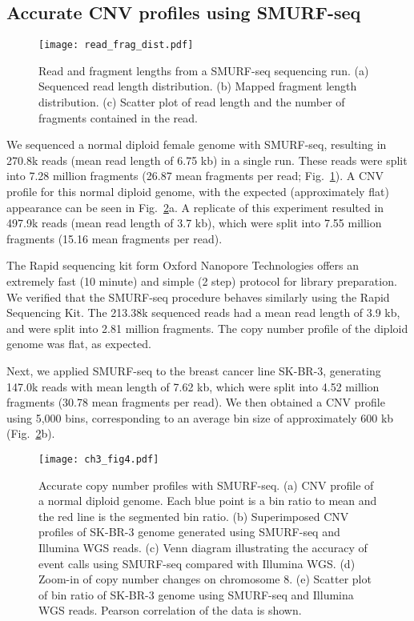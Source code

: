 \subsection{Accurate CNV profiles using SMURF-seq}
\begin{figure}[t!]
\centering
\texttt{[image: read\_frag\_dist.pdf]}
\caption[Read and fragment lengths from a SMURF-seq sequencing run.]{
  Read and fragment lengths from a SMURF-seq sequencing run.
  (a) Sequenced read length distribution.
  (b) Mapped fragment length distribution.
  (c) Scatter plot of read length and the number of fragments contained
  in the read.}
\label{read_frag_dist}
\end{figure}

We sequenced a normal diploid female genome with SMURF-seq, resulting in
270.8k reads (mean read length of 6.75 kb) in a single run. These reads
were split into 7.28 million fragments (26.87 mean fragments per read;
Fig.~\ref{read_frag_dist}).
A CNV profile for this normal diploid genome, with the expected
(approximately flat) appearance can be seen in Fig.~\ref{cnv}a.
A replicate of this experiment resulted in 497.9k reads (mean read
length of 3.7 kb), which were split into 7.55 million fragments (15.16
mean fragments per read).

The Rapid sequencing kit form Oxford Nanopore Technologies offers an
extremely fast (10 minute) and simple (2 step) protocol for library
preparation. We verified that the SMURF-seq procedure behaves similarly
using the Rapid Sequencing Kit. The 213.38k sequenced reads had a mean
read length of 3.9 kb, and were split into 2.81 million fragments.
The copy number profile of the diploid genome was flat, as expected.

Next, we applied SMURF-seq to the breast cancer line SK-BR-3, generating
147.0k reads with mean length of 7.62 kb, which were split into 4.52
million fragments (30.78 mean fragments per read). We then obtained a
CNV profile using 5,000 bins, corresponding to an average bin size of
approximately 600 kb (Fig.~\ref{cnv}b).

\begin{figure}[b!]
\centering
\texttt{[image: ch3\_fig4.pdf]}
\caption[Accurate copy number profiles with SMURF-seq.]{
  Accurate copy number profiles with SMURF-seq.
  (a) CNV profile of a normal diploid genome. Each blue point is a
  bin ratio to mean and the red line is the segmented bin ratio.
  (b) Superimposed CNV profiles of SK-BR-3 genome generated using
  SMURF-seq and Illumina WGS reads.
  (c) Venn diagram illustrating the accuracy of event calls using
  SMURF-seq compared with Illumina WGS.
  (d) Zoom-in of copy number changes on chromosome 8.
  (e) Scatter plot of bin ratio of SK-BR-3 genome using
  SMURF-seq and Illumina WGS reads. Pearson correlation of the data
  is shown.}
\label{cnv}
\end{figure}

